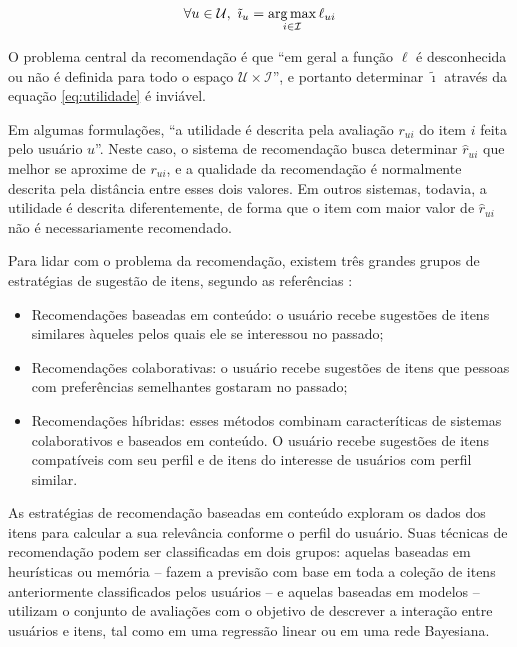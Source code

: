 \begin{equation} 
\label{eq:utilidade}
\forall u \in \mathcal{U}, ~ \tilde{\imath}_u = \operatorname*{arg\,max}_{i \in \mathcal{I}}{\ell_{ui}}
\end{equation}

O problema central da recomendação é que ``em geral a função $\ell$ é desconhecida ou não é definida para todo o espaço $\mathcal{U} \times \mathcal{I}$'', e portanto determinar $\tilde{\imath}$ através da equação \ref{eq:utilidade} é inviável. 

Em algumas formulações, ``a utilidade é descrita pela avaliação $r_{ui}$ do item $i$ feita pelo usuário $u$''. Neste caso, o sistema de recomendação busca determinar $\hat{r}_{ui}$ que melhor se aproxime de $r_{ui}$, e a qualidade da recomendação é normalmente descrita pela distância entre esses dois valores. Em outros sistemas, todavia, a utilidade é descrita diferentemente, de forma que o item com maior valor de $\hat{r}_{ui}$ não é necessariamente recomendado. 

Para lidar com o problema da recomendação, existem três grandes grupos de estratégias de sugestão de itens, segundo as referências \cite{adomavicius2005toward,balabanovic97fab}:

\begin{itemize}
\item Recomendações baseadas em conteúdo: o usuário recebe sugestões de itens similares àqueles pelos quais ele se interessou no passado;
\item Recomendações colaborativas: o usuário recebe sugestões de itens que pessoas com preferências semelhantes gostaram no passado;
\item Recomendações híbridas: esses métodos combinam caracteríticas de sistemas colaborativos e baseados em conteúdo.  O usuário recebe sugestões de itens compatíveis com seu perfil e de itens do interesse de usuários com perfil similar.
\end{itemize}

As estratégias de recomendação baseadas em conteúdo exploram os dados dos itens para calcular a sua relevância conforme o perfil do usuário. Suas técnicas de recomendação podem ser classificadas em dois grupos: aquelas baseadas em heurísticas ou memória -- fazem a previsão com base em toda a coleção de itens anteriormente classificados pelos usuários -- e aquelas baseadas em modelos -- utilizam o conjunto de avaliações com o objetivo de descrever a interação entre usuários e itens, tal como em uma regressão linear ou em uma rede Bayesiana. 


